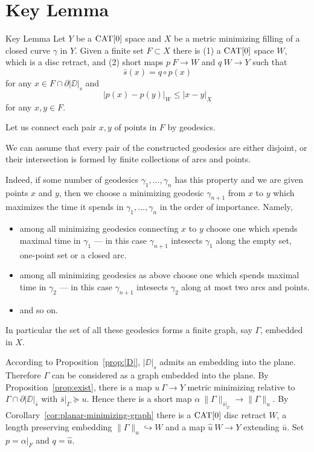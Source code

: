 \documentclass{article}
\begin{document}
\section{Key Lemma}\label{Key Lemma}


\begin{thm}{Key Lemma}\label{lem:key}
Let $Y$ be a $\mathop{\rm CAT}\nolimits[0]$ space and $X$ 
be a metric minimizing filling of a closed curve $\gamma$ in $Y$.
Given a finite set $F\subset X$ 
there is 
(1) a $\mathop{\rm CAT}\nolimits[0]$ space $W$, which is a disc retract,
and (2) short maps $p\:F\to W$ and $q\:W\to Y$ such that
\[\bar s(x)=q\circ p(x)\] 
for any $x\in F\cap \partial |\DD|_s$
and 
\[|p(x)-p(y)|_W\le |x-y|_X\] 
for any $x,y\in F$.
\end{thm}

Let us connect each pair $x,y$ of points in $F$ by geodesics.

We can assume that 
every pair of the constructed geodesics 
are either disjoint, or their intersection is formed by finite collections of arcs and points.

Indeed, if some number of geodesics $\gamma_1,\dots,\gamma_n$ has this property and we are given points $x$ and $y$, then
we choose a minimizing geodesic $\gamma_{n+1}$ from $x$ to $y$ which maximizes the time it spends in $\gamma_1,\dots,\gamma_n$  in the order of importance.
Namely, 
\begin{itemize}
\item  among all minimizing geodesics connecting $x$ to $y$
choose one which spends maximal time in $\gamma_1$ --- in this case $\gamma_{n+1}$ intesects $\gamma_1$ along the empty set, one-point set or a closed arc.
\item among all minimizing geodesics as above
choose one which spends maximal time in $\gamma_2$ --- in this case $\gamma_{n+1}$ intesects $\gamma_2$ along at most two arcs and points.
\item and so on.
\end{itemize}


In particular the set of all these geodesics forms a finite graph, say $\Gamma$,
embedded in $X$. 

According to Proposition~\ref{prop:|D|},
$|\DD|_s$ admits an embedding into the plane.
Therefore $\Gamma$ can be considered as a graph embedded into the plane.
By Proposition~\ref{prop:exist}, there is a map $u\:\Gamma\to Y$ metric minimizing relative to $\Gamma\cap\partial|\DD|_{\bar s}$ with
$\bar s|_\Gamma\succcurlyeq u$.
Hence there is a short map $\alpha\:\|\Gamma\|_{\bar s|_\Gamma}\to\|\Gamma\|_u$. 
By Corollary~\ref{cor:planar-minimizing-graph} there is a $\mathop{\rm CAT}\nolimits[0]$ disc retract $W$, a length preserving embedding
$\|\Gamma\|_u\hookrightarrow W$ and a map $\hat u\:W\to Y$ extending $\bar u$. %
Set $p=\alpha|_F$ and $q=\hat u$.
\qeds
\end{document}
